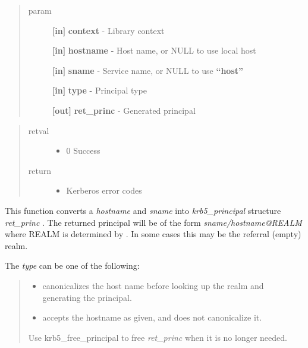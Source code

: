 \documentclass[letterpaper,10pt,english]{sphinxmanual}
\begin{document}
\begin{quote}\begin{description}
\item[{param}] \leavevmode
\textbf{{[}in{]}} \textbf{context} - Library context

\textbf{{[}in{]}} \textbf{hostname} - Host name, or NULL to use local host

\textbf{{[}in{]}} \textbf{sname} - Service name, or NULL to use \textbf{``host''}

\textbf{{[}in{]}} \textbf{type} - Principal type

\textbf{{[}out{]}} \textbf{ret\_princ} - Generated principal

\end{description}\end{quote}
\begin{quote}\begin{description}
\item[{retval}] \leavevmode\begin{itemize}
\item {} 
0   Success

\end{itemize}

\item[{return}] \leavevmode\begin{itemize}
\item {} 
Kerberos error codes

\end{itemize}

\end{description}\end{quote}

This function converts a \emph{hostname} and \emph{sname} into \emph{krb5\_principal} structure \emph{ret\_princ} . The returned principal will be of the form \emph{sname/hostname@REALM} where REALM is determined by {\hyperref[appdev/refs/api/krb5_get_host_realm:c.krb5_get_host_realm]{}} . In some cases this may be the referral (empty) realm.

The \emph{type} can be one of the following:
\begin{quote}
\begin{itemize}
\item {} 
{\hyperref[appdev/refs/macros/KRB5_NT_SRV_HST:KRB5_NT_SRV_HST]{}} canonicalizes the host name before looking up the realm and generating the principal.

\item {} 
{\hyperref[appdev/refs/macros/KRB5_NT_UNKNOWN:KRB5_NT_UNKNOWN]{}} accepts the hostname as given, and does not canonicalize it.

\end{itemize}

Use krb5\_free\_principal to free \emph{ret\_princ} when it is no longer needed.
\end{quote}
\end{document}

